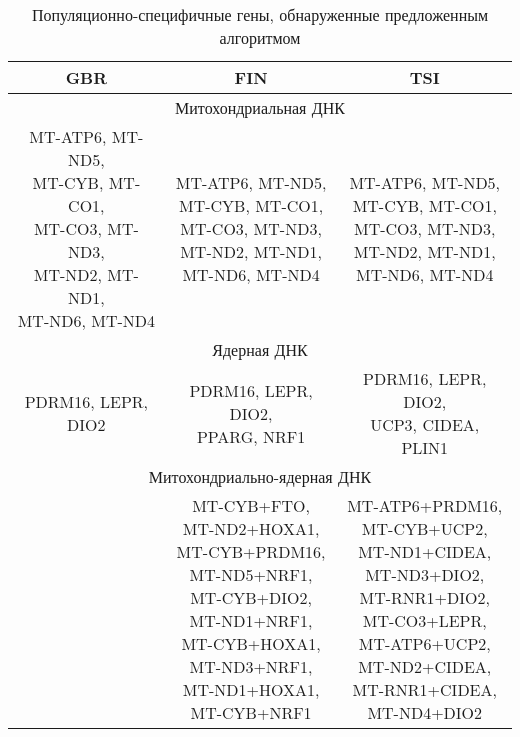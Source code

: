 \begin{table} [htbp]
	\centering
	\begin{threeparttable}
		\caption{Популяционно-специфичные гены, обнаруженные предложенным алгоритмом}%
		\label{tab:pop_specific}%
		\begin{SingleSpace}
			\begin{tabular}{| c | c | c |}
				\hline
				GBR & FIN & TSI \\ \hline
				\multicolumn{3}{|c|}{Митохондриальная ДНК}\\ \hline
				\thead{MT-ATP6, MT-ND5, \\ MT-CYB, MT-CO1, \\ MT-CO3, MT-ND3, \\ MT-ND2, MT-ND1, \\ MT-ND6, MT-ND4}& \thead{MT-ATP6, MT-ND5, \\ MT-CYB, MT-CO1, \\ MT-CO3, MT-ND3, \\ MT-ND2, MT-ND1, \\ MT-ND6, MT-ND4} & \thead{MT-ATP6, MT-ND5, \\ MT-CYB, MT-CO1, \\ MT-CO3, MT-ND3, \\ MT-ND2, MT-ND1, \\ MT-ND6, MT-ND4}\\ \hline
				\multicolumn{3}{|c|}{Ядерная ДНК}\\ \hline
				PDRM16, LEPR, DIO2 & \thead{PDRM16, LEPR, DIO2, \\ PPARG, NRF1} & \thead{PDRM16, LEPR, DIO2, \\ UCP3, CIDEA, PLIN1} \\ \hline
				\multicolumn{3}{|c|}{Митохондриально-ядерная ДНК}\\ \hline
				& \thead{MT-CYB+FTO, \\ MT-ND2+HOXA1, \\ MT-CYB+PRDM16, \\ MT-ND5+NRF1, \\ MT-CYB+DIO2, \\ MT-ND1+NRF1, \\ MT-CYB+HOXA1, \\ MT-ND3+NRF1, \\ MT-ND1+HOXA1, \\ MT-CYB+NRF1}& \thead{MT-ATP6+PRDM16, \\ MT-CYB+UCP2, \\ MT-ND1+CIDEA, \\ MT-ND3+DIO2, \\ MT-RNR1+DIO2, \\ MT-CO3+LEPR, \\ MT-ATP6+UCP2, \\ MT-ND2+CIDEA, \\ MT-RNR1+CIDEA, \\ MT-ND4+DIO2}\\ \hline
			\end{tabular}%
		\end{SingleSpace}
	\end{threeparttable}
\end{table}

